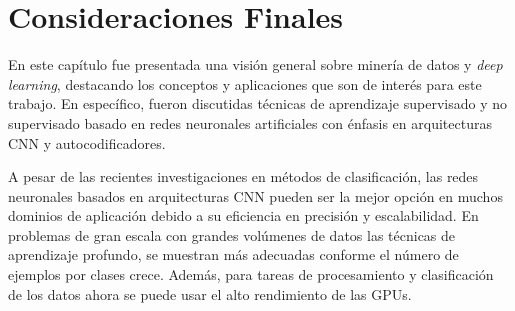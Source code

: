 \section{Consideraciones Finales}\label{sec:consideraciones-finales}

En este capítulo fue presentada una visión general sobre minería de datos y \textit{deep learning}, destacando los conceptos y aplicaciones que son  de interés para este trabajo. En específico, fueron discutidas técnicas de aprendizaje supervisado y no supervisado basado en redes neuronales artificiales con énfasis en arquitecturas CNN y autocodificadores. 

A pesar de las recientes investigaciones en métodos de clasificación,  las redes neuronales basados en arquitecturas CNN  pueden ser la mejor opción en muchos dominios de aplicación debido a su eficiencia en precisión y escalabilidad. En problemas de gran escala con grandes volúmenes de datos las técnicas de aprendizaje profundo,  se muestran más adecuadas conforme el número de ejemplos por clases crece. Además, para tareas de procesamiento y clasificación de los datos  ahora se puede usar el alto rendimiento de las GPUs.    
 



